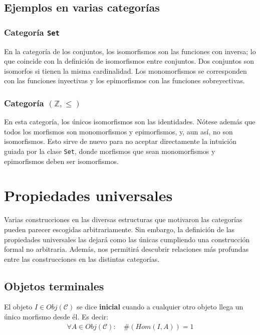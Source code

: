 \documentclass[a4paper, 11pt]{amsart}
\newcommand{\C}{\mathcal{C} }
\theoremstyle{definition}
\theoremstyle{remark}
\numberwithin{equation}{section}
\begin{document}
  \subsection {Ejemplos en varias categorías}
    \subsubsection{Categoría \texttt{Set}}
      En la categoría de los conjuntos, los isomorfismos son las funciones con inversa; lo
      que coincide con la definición de isomorfismos entre conjuntos. Dos conjuntos son
      isomorfos si tienen la misma cardinalidad.
      Los monomorfismos se corresponden con las funciones inyectivas y los epimorfismos con
      las funciones sobreyectivas.
    
    \subsubsection{Categoría \texttt{$(\mathbb{Z},\leq)$}}
      En esta categoría, los únicos isomorfismos son las identidades. Nótese además
      que todos los morfismos son monomorfismos y epimorfismos, y, aun así, no son
      isomorfismos. Esto sirve de nuevo para no aceptar directamente la intuición
      guiada por la clase \texttt{Set}, donde morfismos que sean monomorfismos y
      epimorfismos deben ser isomorfismos.
      
\newpage
\section {Propiedades universales}
  Varias construcciones en las diversas estructuras que motivaron las categorías pueden parecer
  escogidas arbitrariamente. Sin embargo, la definición de las propiedades universales las dejará
  como las únicas cumpliendo una construcción formal no arbitraria. Además, nos permitirá descubrir
  relaciones más profundas entre las construcciones en las distintas categorías.
  
  \subsection {Objetos terminales}
     El objeto $I \in Obj(\C)$ se dice \textbf{inicial} cuando a cualquier otro objeto llega
    un único morfismo desde él. Es decir:
    \begin{gather*}
      \forall A \in Obj(\C):\quad \#(Hom(I,A)) = 1
    \end{gather*}
\end{document}
